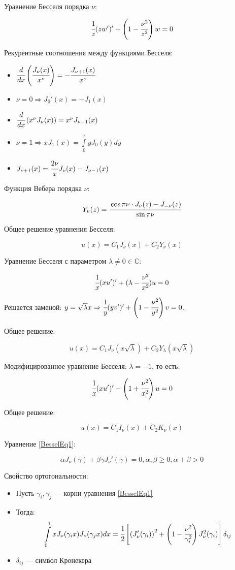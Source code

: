 Уравнение Бесселя порядка $\nu$:

\[
\cfrac{1}{z}(zw')'+\left(1 - \cfrac{\nu^2}{z^2}\right)w = 0
\]

Рекурентные соотношения между функциями Бесселя:

\begin{itemize}
	\item $\cfrac{d}{dx}\left(\cfrac{J_{\nu}(x)}{x^{\nu}}\right) = -\cfrac{J_{\nu+1}(x)}{x^{\nu}}$
	\item $\nu = 0 \Rightarrow J_0'(x) = -J_1(x)$
	\item $\cfrac{d}{dx}\left(x^{\nu}J_{\nu}(x)\right) = x^{\nu}J_{\nu - 1}(x)$
	\item $\nu = 1 \Rightarrow xJ_1(x) = \int\limits_0^x yJ_0(y)dy$
	\item $J_{\nu+1}(x) = \cfrac{2\nu}{x}J_{\nu}(x) - J_{\nu - 1}(x)$
\end{itemize}

Функция Вебера порядка $\nu$:

\[
Y_{\nu}(z) = \cfrac{\cos \pi\nu \cdot J_{\nu}(z) - J_{-\nu}(z)}{\sin \pi \nu}
\]

Общее решение уравнения Бесселя:

\[
u(x) = C_1J_{\nu}(x) + C_2Y_{\nu}(x)
\]

\newpage

Уравнение Бесселя с параметром $\lambda \ne 0 \in \mathds{C}$:

\[
\cfrac{1}{x}(xu')'+(\lambda - \cfrac{\nu^2}{x^2})u = 0
\]

Решается заменой: $y = \sqrt{\lambda}x \Rightarrow \cfrac{1}{y}(yv')'+\left(1 - \cfrac{\nu^2}{y^2}\right)v=0$.

Общее решение:

\[
u(x)=C_1J_{\nu}(x\sqrt{\lambda})+C_2Y_{\lambda}(x\sqrt{\lambda})
\]

Модифицированное уравнение Бесселя: $\lambda = -1$, то есть:

\[
\cfrac{1}{x}(xu')'-\left(1+\cfrac{\nu^2}{x^2}\right)u = 0
\]

Общее решение:

\[
u(x) = C_1I_{\nu}(x) + C_2K_{\nu}(x)
\]

Уравнение \eqref{BesselEq1}:

\begin{equation}\label{BesselEq1}
	\alpha J_{\nu}(\gamma) + \beta \gamma J_{\nu}'(\gamma) = 0, \alpha, \beta \ge 0, \alpha + \beta > 0
\end{equation}

Свойство ортогональности:

\begin{itemize}
	\item Пусть $\gamma_i, \gamma_j$ --- корни уравнения \eqref{BesselEq1}
	
	\item Тогда:
	\[
	\int\limits_0^1 xJ_{\nu}(\gamma_ix)J_{\nu}(\gamma_jx)dx = \cfrac{1}{2}\left[\left(J_{\nu}'(\gamma_i)\right)^2 + \left(1 - \cfrac{\nu^2}{\gamma_i^2}\right)J_{\nu}^2(\gamma_i)\right]\delta_{ij}
	\]
	
	\item $\delta_{ij}$ --- символ Кронекера
\end{itemize}